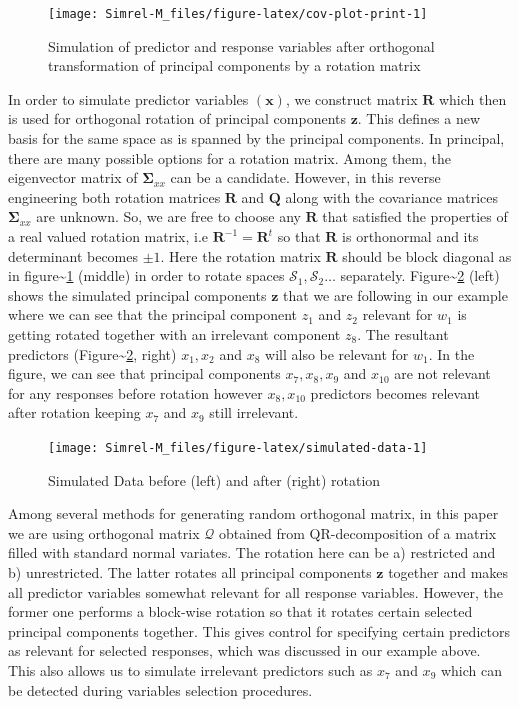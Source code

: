 \documentclass[12pt,A4paper,authoryear]{elsarticle} %
\theoremstyle{definition}
\theoremstyle{definition}
\theoremstyle{remark}
\begin{document}
\begin{figure}
\texttt{[image: Simrel-M\_files/figure-latex/cov-plot-print-1]} \caption{Simulation of predictor and response variables after orthogonal transformation of principal components by a rotation matrix}\label{fig:cov-plot-print}
\end{figure}

In order to simulate predictor variables \((\mathbf{x})\), we construct
matrix \(\mathbf{R}\) which then is used for orthogonal rotation of
principal components \(\mathbf{z}\). This defines a new basis for the
same space as is spanned by the principal components. In principal,
there are many possible options for a rotation matrix. Among them, the
eigenvector matrix of \(\boldsymbol{\Sigma}_{xx}\) can be a candidate.
However, in this reverse engineering both rotation matrices
\(\mathbf{R}\) and \(\mathbf{Q}\) along with the covariance matrices
\(\boldsymbol{\Sigma}_{xx}\) are unknown. So, we are free to choose any
\(\mathbf{R}\) that satisfied the properties of a real valued rotation
matrix, i.e \(\mathbf{R}^{-1} = \mathbf{R}^t\) so that \(\mathbf{R}\) is
orthonormal and its determinant becomes \(\pm 1\). Here the rotation
matrix \(\mathbf{R}\) should be block diagonal as in
figure\textasciitilde{}\ref{fig:cov-plot-print} (middle) in order to
rotate spaces \(\mathcal{S}_1, \mathcal{S}_2 \ldots\) separately.
Figure\textasciitilde{}\ref{fig:simulated-data} (left) shows the
simulated principal components \(\mathbf{z}\) that we are following in
our example where we can see that the principal component \(z_{1}\) and
\(z_{2}\) relevant for \(w_1\) is getting rotated together with an
irrelevant component \(z_{8}\). The resultant predictors
(Figure\textasciitilde{}\ref{fig:simulated-data}, right)
\(x_{1}, x_{2}\) and \(x_{8}\) will also be relevant for \(w_1\). In the
figure, we can see that principal components \(x_{7}, x_{8}, x_{9}\) and
\(x_{10}\) are not relevant for any responses before rotation however
\(x_{8}, x_{10}\) predictors becomes relevant after rotation keeping
\(x_{7}\) and \(x_{9}\) still irrelevant.

\begin{figure}
\texttt{[image: Simrel-M\_files/figure-latex/simulated-data-1]} \caption{Simulated Data before (left) and after (right) rotation}\label{fig:simulated-data}
\end{figure}

Among several methods
\citep{anderson1987generation, heiberger1978algorithm} for generating
random orthogonal matrix, in this paper we are using orthogonal matrix
\(\mathcal{Q}\) obtained from QR-decomposition of a matrix filled with
standard normal variates. The rotation here can be a) restricted and b)
unrestricted. The latter rotates all principal components \(\mathbf{z}\)
together and makes all predictor variables somewhat relevant for all
response variables. However, the former one performs a block-wise
rotation so that it rotates certain selected principal components
together. This gives control for specifying certain predictors as
relevant for selected responses, which was discussed in our example
above. This also allows us to simulate irrelevant predictors such as
\(x_{7}\) and \(x_{9}\) which can be detected during variables selection
procedures.
\end{document}
